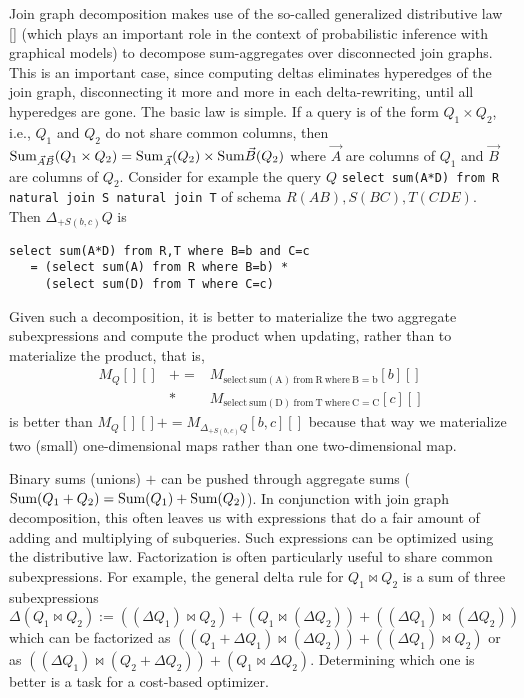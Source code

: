 Join graph decomposition makes use of the so-called generalized distributive law [] (which plays
an important role in the context of probabilistic inference with graphical models) to decompose
sum-aggregates over disconnected join graphs. This is an important case, since computing deltas 
eliminates hyperedges of the join graph, disconnecting it more and more in each delta-rewriting, until all
hyperedges are gone. The basic law is simple. If a query is of the form $Q_1 \times Q_2$, i.e., $Q_1$ and
$Q_2$ do not share common columns, then
$\mbox{Sum}_{\vec{A}\vec{B}}(Q_1 \times Q_2) = \mbox{Sum}_{\vec{A}}(Q_2) \times \mbox{Sum}{\vec{B}}(Q_2)$
where $\vec{A}$ are columns of $Q_1$ and $\vec{B}$ are columns of $Q_2.$
Consider for example the query $Q$
{\tt select sum(A*D) from R natural join S natural join T}
of schema $R(AB), S(BC), T(CDE)$. Then
$\Delta_{+S(b,c)} Q$ is
\begin{verbatim}
select sum(A*D) from R,T where B=b and C=c
   = (select sum(A) from R where B=b) *
     (select sum(D) from T where C=c)
\end{verbatim}
Given such a decomposition, it is better to materialize the two aggregate subexpressions and compute
the product when updating, rather than to materialize the product, that is,
\begin{eqnarray*}
M_Q[][] &+=& M_{\mathrm{select~sum(A)~from~R~where~B=b}}[b][] \\
&*& M_{\mathrm{select~sum(D)~from~T~where~C=C}}[c][]
\end{eqnarray*}
is better than
$M_Q[][] += M_{\Delta_{+S(b,c)} Q}[b,c][]$ because that way we materialize two (small) one-dimensional
maps rather than one two-dimensional map.

Binary sums  (unions) $+$ can be pushed through aggregate sums ($\mbox{Sum}(Q_1 + Q_2) = \mbox{Sum}(Q_1) + \mbox{Sum}(Q_2)$).
In conjunction with join graph decomposition, this often leaves us with expressions that do a fair amount
of adding and multiplying of subqueries. Such expressions can be optimized using the distributive law.
Factorization is often particularly useful to share common subexpressions.
For example, the general delta rule for $Q_1 \bowtie Q_2$ is a sum of three subexpressions
$\Delta(Q_1 \bowtie Q_2) := ((\Delta Q_1) \bowtie Q_2) + (Q_1 \bowtie (\Delta Q_2))
 + ((\Delta Q_1) \bowtie (\Delta Q_2))$ which can be factorized as
$((Q_1 + \Delta Q_1) \bowtie (\Delta Q_2)) + ((\Delta Q_1) \bowtie  Q_2)$
or as
$((\Delta Q_1) \bowtie (Q_2 + \Delta Q_2)) + (Q_1 \bowtie \Delta Q_2)$.
Determining which one is better is a task for a cost-based optimizer.







